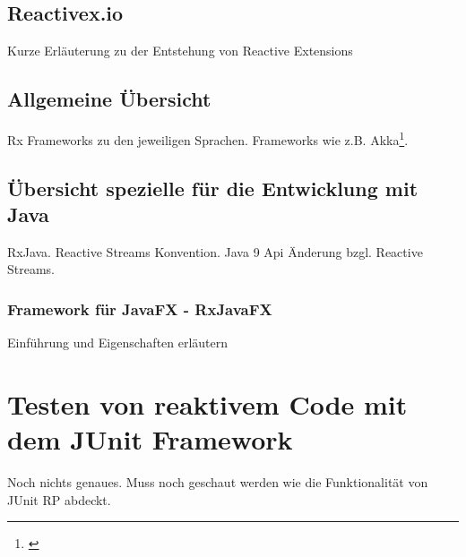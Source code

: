 \subsection{Reactivex.io}
Kurze Erläuterung zu der Entstehung von Reactive Extensions
\subsection{Allgemeine Übersicht}
Rx Frameworks zu den jeweiligen Sprachen. Frameworks wie z.B. Akka\footnote{\cite{Karnok.2016}}. 
\subsection{Übersicht spezielle für die Entwicklung mit Java}
RxJava. Reactive Streams Konvention. Java 9 Api Änderung bzgl. Reactive Streams.
\subsubsection{Framework für JavaFX - RxJavaFX}
Einführung und Eigenschaften erläutern
\section{Testen von reaktivem Code mit dem JUnit Framework}
Noch nichts genaues. Muss noch geschaut werden wie die Funktionalität von JUnit RP abdeckt.